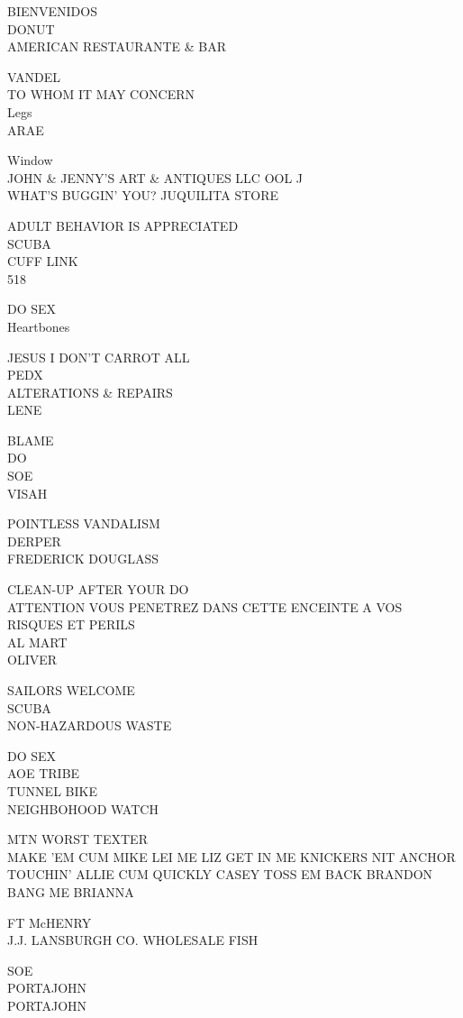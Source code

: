\documentclass[10pt,letterpaper]{article}
\begin{document}
BIENVENIDOS\\
DONUT\\
AMERICAN RESTAURANTE \& BAR

VANDEL\\
TO WHOM IT MAY CONCERN\\
Legs\\
ARAE

Window\\
JOHN \& JENNY'S ART \& ANTIQUES LLC OOL J\\
WHAT'S BUGGIN' YOU? JUQUILITA STORE

ADULT BEHAVIOR IS APPRECIATED\\
SCUBA\\
CUFF LINK\\
518

DO SEX\\
Heartbones

JESUS I DON'T CARROT ALL\\
PEDX\\
ALTERATIONS \& REPAIRS\\
LENE

BLAME\\
DO\\
SOE\\
VISAH

POINTLESS VANDALISM\\
DERPER\\
FREDERICK DOUGLASS

CLEAN{-}UP AFTER YOUR DO\\
ATTENTION VOUS PENETREZ DANS CETTE ENCEINTE A VOS RISQUES ET PERILS\\
AL MART\\
OLIVER

SAILORS WELCOME\\
SCUBA\\
NON{-}HAZARDOUS WASTE

DO SEX\\
AOE TRIBE\\
TUNNEL BIKE\\
NEIGHBOHOOD WATCH

MTN WORST TEXTER\\
MAKE 'EM CUM MIKE LEI ME LIZ GET IN ME KNICKERS NIT ANCHOR TOUCHIN' ALLIE CUM QUICKLY CASEY TOSS EM BACK BRANDON BANG ME BRIANNA

FT McHENRY\\
J.J. LANSBURGH CO. WHOLESALE FISH

SOE\\
PORTAJOHN\\
PORTAJOHN
\end{document}
